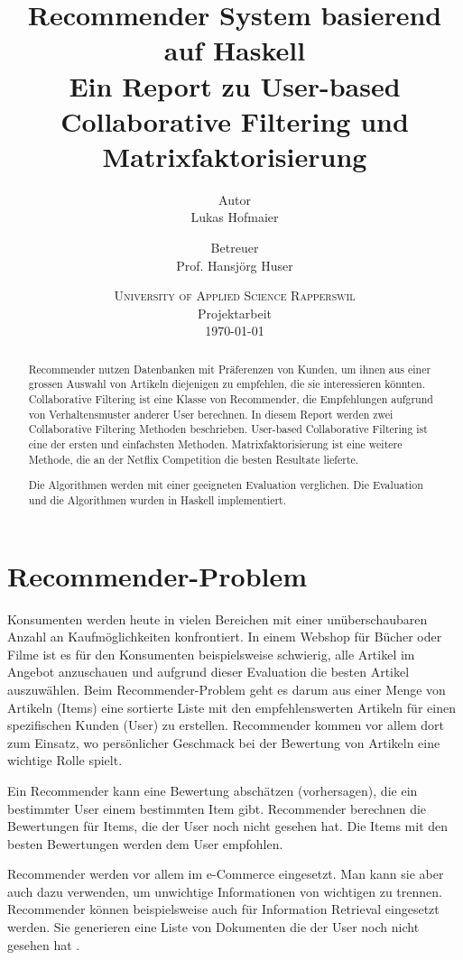 \documentclass[a4paper, 12pt]{article}
\author{Autor \\ Lukas Hofmaier \and Betreuer\\ Prof. Hansjörg Huser \\}
\title{Recommender System basierend auf Haskell \\ \vspace{2 mm} {\large Ein Report zu User-based Collaborative Filtering und Matrixfaktorisierung}}
\date{
\textsc{University of Applied Science Rapperswil}\\
Projektarbeit \\ \today
}
\begin{document}
\lstset{basicstyle=\small,
language=Haskell,
stringstyle=ttfamiliy
}

\clearpage\maketitle
\thispagestyle{empty}
\newpage
\setcounter{page}{1}
\tableofcontents
\newpage

\begin{abstract}
Recommender nutzen Datenbanken mit Präferenzen von Kunden, um ihnen aus einer grossen Auswahl von Artikeln diejenigen zu empfehlen, die sie interessieren könnten. Collaborative Filtering ist eine Klasse von Recommender, die Empfehlungen aufgrund von Verhaltensmuster anderer User berechnen.
In diesem Report werden zwei Collaborative Filtering Methoden beschrieben. User-based Collaborative Filtering ist eine der ersten und einfachsten Methoden. Matrixfaktorisierung ist eine weitere Methode, die an der Netflix Competition die besten Resultate lieferte.

Die Algorithmen werden mit einer geeigneten Evaluation verglichen. Die Evaluation und die Algorithmen wurden in Haskell implementiert.

\end{abstract}

\section{Recommender-Problem}
\label{sec:problem}

Konsumenten werden heute in vielen Bereichen mit einer unüberschaubaren Anzahl an Kaufmöglichkeiten konfrontiert. In einem Webshop für Bücher oder Filme ist es für den Konsumenten beispielsweise schwierig, alle Artikel im Angebot anzuschauen und aufgrund dieser Evaluation die besten Artikel auszuwählen. Beim Recommender-Problem geht es darum aus einer Menge von Artikeln (Items) eine sortierte Liste mit den empfehlenswerten Artikeln für einen spezifischen Kunden (User) zu erstellen. Recommender kommen vor allem dort zum Einsatz, wo persönlicher Geschmack bei der Bewertung von Artikeln eine wichtige Rolle spielt.

Ein Recommender kann eine Bewertung abschätzen (vorhersagen), die ein bestimmter User einem bestimmten Item gibt. Recommender berechnen die Bewertungen für Items, die der User noch nicht gesehen hat. Die Items mit den besten Bewertungen werden dem User empfohlen.

Recommender werden vor allem im e-Commerce eingesetzt. Man kann sie aber auch dazu verwenden, um unwichtige Informationen von wichtigen zu trennen. Recommender können beispielsweise auch für Information Retrieval eingesetzt werden. Sie generieren eine Liste von Dokumenten die der User noch nicht gesehen hat \cite{herlocker00}.
\end{document}
